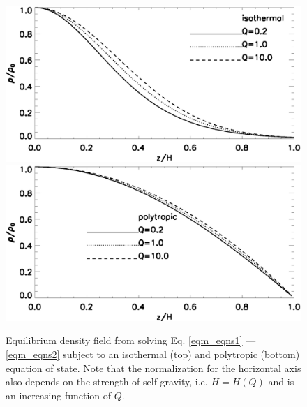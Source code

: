 \begin{figure}
  \includegraphics[width=\linewidth,clip=true,trim=0cm 1.5cm 0cm 0cm]{figures/compare_iso_density}
  \includegraphics[width=\linewidth,clip=true,trim=0cm 0cm 0cm 0.9cm]{figures/compare_poly_density}
  \caption{Equilibrium density field from solving Eq. \ref{eqm_eqns1}
    --- \ref{eqm_eqns2} subject to an isothermal (top) and polytropic
    (bottom) equation of state. Note that the normalization for the
    horizontal axis also depends on the strength of self-gravity,
    i.e. $H=H(Q)$ and is an increasing function of $Q$. 
\label{eqm_den}}
\end{figure}





